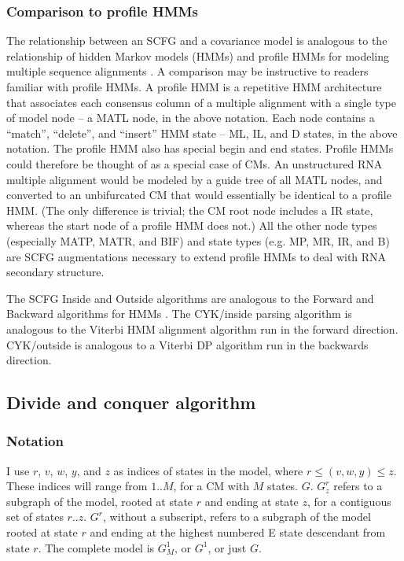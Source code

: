 \documentclass[11pt]{article}
\begin{document}
\subsubsection{Comparison to profile HMMs}

The relationship between an SCFG and a covariance model is analogous
to the relationship of hidden Markov models (HMMs) and profile HMMs
for modeling multiple sequence alignments
\cite{Krogh94,Durbin98,Eddy98}. A comparison may be instructive to
readers familiar with profile HMMs.  A profile HMM is a repetitive HMM
architecture that associates each consensus column of a multiple
alignment with a single type of model node -- a MATL node, in the
above notation. Each node contains a ``match'', ``delete'', and
``insert'' HMM state -- ML, IL, and D states, in the above notation.
The profile HMM also has special begin and end states. Profile HMMs
could therefore be thought of as a special case of CMs. An
unstructured RNA multiple alignment would be modeled by a guide tree
of all MATL nodes, and converted to an unbifurcated CM that would
essentially be identical to a profile HMM. (The only difference is
trivial; the CM root node includes a IR state, whereas the start node
of a profile HMM does not.) All the other node types (especially MATP,
MATR, and BIF) and state types (e.g. MP, MR, IR, and B) are SCFG
augmentations necessary to extend profile HMMs to deal with RNA
secondary structure.

The SCFG Inside and Outside algorithms are analogous to the Forward
and Backward algorithms for HMMs \cite{Rabiner89,Durbin98}.  The
CYK/inside parsing algorithm is analogous to the Viterbi HMM alignment
algorithm run in the forward direction. CYK/outside is analogous to a
Viterbi DP algorithm run in the backwards direction.



\subsection{Divide and conquer algorithm}

\subsubsection{Notation}

I use $r$, $v$, $w$, $y$, and $z$ as indices of states in the model,
where $r \leq (v,w,y) \leq z$. These indices will range from $1..M$, for
a CM with $M$ states. $G$. $G^r_z$ refers to a subgraph of the model,
rooted at state $r$ and ending at state $z$, for a contiguous set of
states $r..z$. $G^r$, without a subscript, refers to a subgraph of the
model rooted at state $r$ and ending at the highest numbered E state
descendant from state $r$. The complete model is $G^1_M$, or $G^1$, or
just $G$.
\end{document}
